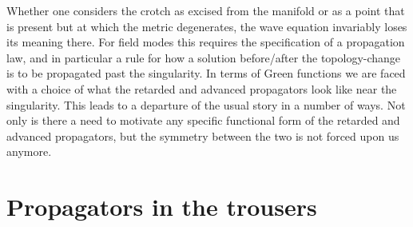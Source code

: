 \documentclass[12pt]{article}
\begin{document}


Whether one considers the crotch as excised from the manifold or as a point that is present but at which the metric degenerates, the wave equation invariably loses its meaning there. For field modes this requires the specification of a propagation law, and in particular a rule for how a solution before/after the topology-change is to be propagated past the singularity. In terms of Green functions we are faced with a choice of what the retarded and advanced propagators look like near the singularity. This leads to a departure of the usual story in a number of ways. Not only is there a need to motivate any specific functional form of the retarded and advanced propagators, but the symmetry between the two is not forced upon us anymore.%

\section{Propagators in the trousers}
\end{document}
